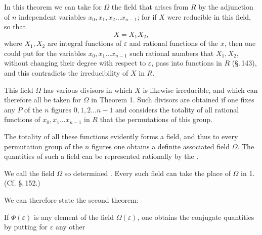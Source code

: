 
In this theorem we can take for $\Omega$ the field that arises from $R$ by the adjunction of $n$ independent variables $x_0, x_1, x_2 \ldots x_{n-1}$; for if $X$ were reducible in this field, so that
\[
X = X_1 X_2,
\]
where $X_1, X_2$ are integral functions of $\varepsilon$ and rational functions of the $x$, then one could put for the variables $x_0, x_1 \ldots x_{n-1}$ such rational numbers that $X_1, X_2$, without changing their degree with respect to $\varepsilon$, pass into functions in $R$ (\S.\,143), and this contradicts the irreducibility of $X$ in $R$.

This field $\Omega$ has various divisors in which $X$ is likewise irreducible, and which can therefore all be taken for $\Omega$ in Theorem 1. Such divisors are obtained if one fixes any  $P$ of the $n$ figures $0, 1, 2 \ldots n-1$ and considers the totality of all rational functions of $x_0, x_1 \ldots x_{n-1}$ in $R$ that  the permutations of this group.

The totality of all these functions evidently forms a field, and thus to every permutation group of the $n$ figures one obtains a definite associated field $\Omega$. The quantities of such a field can be represented rationally by the .

We call the field $\Omega$ so determined . Every such field can take the place of $\Omega$ in 1. (Cf. \S.\,152.)

We can therefore state the second theorem:


If $\Phi(\varepsilon)$ is any element of the field $\Omega(\varepsilon)$, one obtains the conjugate quantities by putting for $\varepsilon$ any other
